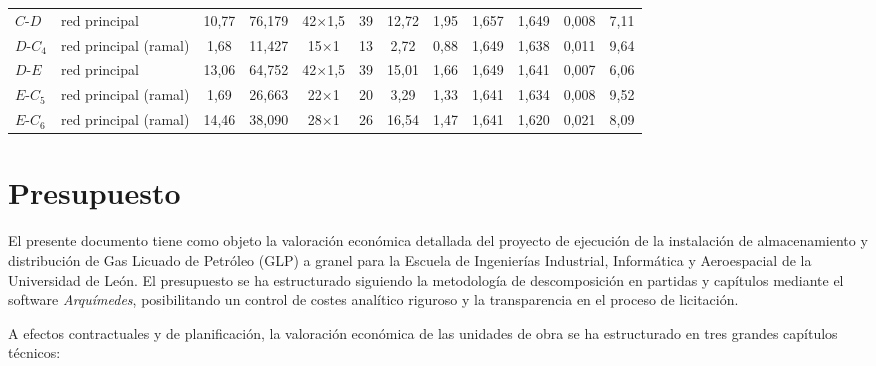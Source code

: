 \documentclass[12pt]{article}
\begin{document}
\begin{landscape}
\begin{table}[p]
{\begin{tabular}{llcccccccccc}
                $C$-$D$ & red principal & 10,77 & 76,179 & 42$\times$1,5 & 39 & 12,72 & 1,95 & 1,657 & 1,649 & 0,008 & 7,11 \\
                $D$-$C_4$ & red principal (ramal) & 1,68 & 11,427 & 15$\times$1 & 13 & 2,72 & 0,88 & 1,649 & 1,638 & 0,011 & 9,64 \\
                $D$-$E$ & red principal & 13,06 & 64,752 & 42$\times$1,5 & 39 & 15,01 & 1,66 & 1,649 & 1,641 & 0,007 & 6,06 \\
                $E$-$C_5$ & red principal (ramal) & 1,69 & 26,663 & 22$\times$1 & 20 & 3,29 & 1,33 & 1,641 & 1,634 & 0,008 & 9,52 \\
                $E$-$C_6$ & red principal (ramal) & 14,46 & 38,090 & 28$\times$1 & 26 & 16,54 & 1,47 & 1,641 & 1,620 & 0,021 & 8,09 \\
                \bottomrule
            \end{tabular}%
            }
        \end{table}
        \end{landscape}


        



    \section{Presupuesto}
    \label{Presupuesto}

        El presente documento tiene como objeto la valoración económica detallada del proyecto de ejecución de la instalación de almacenamiento y distribución de Gas Licuado de Petróleo (GLP) a granel para la Escuela de Ingenierías Industrial, Informática y Aeroespacial de la Universidad de León. El presupuesto se ha estructurado siguiendo la metodología de descomposición en partidas y capítulos mediante el software \textit{Arquímedes}, posibilitando un control de costes analítico riguroso y la transparencia en el proceso de licitación.

        A efectos contractuales y de planificación, la valoración económica de las unidades de obra se ha estructurado en tres grandes capítulos técnicos:
        
\end{document}
